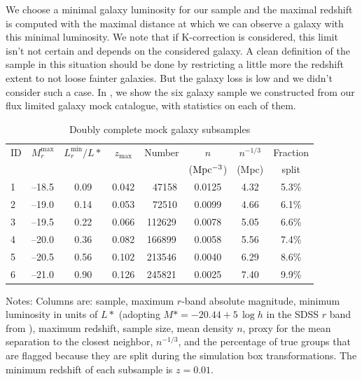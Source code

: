 We choose a minimal galaxy luminosity for our sample and the maximal redshift
is computed with the maximal distance at which we can observe a galaxy with
this minimal luminosity. We note that if K-correction is considered, this
limit isn't not certain and depends on the considered galaxy. A clean
definition of the sample in this situation should be done by restricting a
little more the redshift extent to not loose fainter galaxies. But the galaxy
loss is low and we didn't consider such a case. In , we
show the six galaxy sample we constructed from our flux limited galaxy mock
catalogue, with statistics on each of them.
%
\begin{table}[htb]
    \caption{Doubly complete mock galaxy subsamples\label{tab:samples}}
    \begin{center}
    \setlength{\tabcolsep}{3pt}
    \begin{tabular}{lccccccc}
    \toprule
    \toprule
    ID & $M_r^{\max}$ & $L_r^{\min}/L*$ & $z_{ \max }$ & Number & $n$
    & $n^{-1/3}$ & Fraction\\
              &            &     &                 &        & ($\rm  Mpc^{-3}$)
    & (Mpc) & split\\
    \toprule
    1 & --18.5 & 0.09 & 0.042 & \ \,47158 & 0.0125 & 4.32 & 5.3\%\\
    2 & --19.0 & 0.14 & 0.053 & \ \,72510 & 0.0099 & 4.66 & 6.1\%\\
    3 & --19.5 & 0.22 & 0.066 & 112629    & 0.0078 & 5.05 & 6.6\%\\
    4 & --20.0 & 0.36 & 0.082 & 166899    & 0.0058 & 5.56 & 7.4\%\\
    5 & --20.5 & 0.56 & 0.102 & 213546    & 0.0040 & 6.29 & 8.6\%\\
    6 & --21.0 & 0.90 & 0.126 & 245821    & 0.0025 & 7.40 & 9.9\%\\
    \bottomrule
    \end{tabular}
    \end{center}
\parbox{\hsize}{Notes: Columns are: sample, maximum $r$-band absolute
    magnitude, minimum luminosity in units of $L*$ (adopting $M*=-20.44 +
    5\,\log h$ in the SDSS $r$ band from \citealp{Blanton+03}), maximum
    redshift, sample size, mean density $n$, proxy for the mean separation to
    the closest neighbor, $n^{-1/3}$, and the percentage of true groups that
    are flagged because they are split during the simulation box
    transformations. The minimum redshift of each subsample is $z=0.01$.
}
\end{table}

